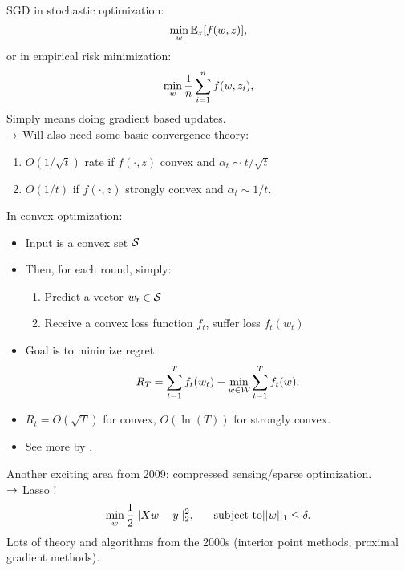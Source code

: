SGD in stochastic optimization:
\begin{equation}
    \min_w \mathbb{E}_z[f(w, z)],
\end{equation}
or in empirical risk minimization:
\begin{equation}
    \min_w \frac{1}{n} \sum_{i = 1}^n f(w,z_i),
\end{equation}
Simply means doing gradient based updates. \\

$\rightarrow$ Will also need some basic convergence theory:
\begin{enumerate}
    \item $O(1 / \sqrt{t})$ rate if $f(\cdot, z)$ convex and $\alpha_t \sim t / \sqrt{t}$
    \item $O(1 / t)$ if $f(\cdot, z)$ strongly convex and $\alpha_t \sim 1/t$.
\end{enumerate}

In convex optimization:
\begin{itemize}
    \item Input is a convex set $\mathcal{S}$
    \item Then, for each round, simply:
    \begin{enumerate}
        \item Predict a vector $w_t \in \mathcal{S}$
        \item Receive a convex loss function $f_t$, suffer loss $f_t(w_t)$
    \end{enumerate}
    \item Goal is to minimize regret:
    \[
    R_T = \sum_{t=1}^T f_t(w_t) - \min_{w \in\mathcal{W}}\sum_{t=1}^T f_t(w).
    \]
    \item $R_t = O(\sqrt{T})$ for convex, $O(\ln(T))$ for strongly convex.
    
    \item See more by \citet{duchi2011adaptive}.
\end{itemize}

Another exciting area from 2009: compressed sensing/sparse optimization. \\

$\rightarrow$ Lasso \cite{tibshirani1996regression}!
\begin{equation}
    \min_w \frac{1}{2} ||Xw - y||_2^2,\hspace{6mm} \text{subject to} ||w||_1 \leq \delta.
\end{equation}
Lots of theory and algorithms from the 2000s (interior point methods, proximal gradient methods). \\

